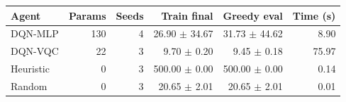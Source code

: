 \begin{tabular}{lrrrrr}
\hline
Agent & Params & Seeds & Train final & Greedy eval & Time (s) \\
\hline
DQN-MLP & 130 & 4 & 26.90 $\pm$ 34.67 & 31.73 $\pm$ 44.62 & 8.90 \\
DQN-VQC & 22 & 3 & 9.70 $\pm$ 0.20 & 9.45 $\pm$ 0.18 & 75.97 \\
Heuristic & 0 & 3 & 500.00 $\pm$ 0.00 & 500.00 $\pm$ 0.00 & 0.14 \\
Random & 0 & 3 & 20.65 $\pm$ 2.01 & 20.65 $\pm$ 2.01 & 0.01 \\
\hline
\end{tabular}
